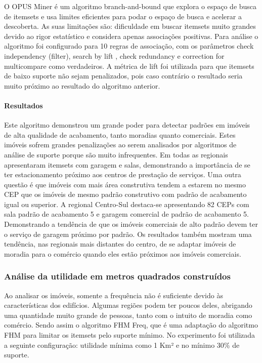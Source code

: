 \documentclass[12pt]{article}
\begin{document}
O OPUS Miner é um algoritmo branch-and-bound que explora o espaço de busca de itemsets e usa limites eficientes para podar o espaço de busca e acelerar a descoberta. As suas limitações são: dificuldade em buscar itemsets muito grandes devido ao rigor estatístico e considera apenas associações positivas. Para análise o algoritmo foi configurado para 10 regras de associação, com os parâmetros check independency (filter), search by lift \cite{wiki:lift}, check redundancy e correction for multicompare como verdadeiros. A métrica de lift foi utilizada para que itemsets de baixo suporte não sejam penalizados, pois caso contrário o resultado seria muito próximo ao resultado do algoritmo anterior.

\paragraph{Resultados}
Este algoritmo demonstrou um grande poder para detectar padrões em imóveis de alta qualidade de acabamento, tanto moradias quanto comerciais. Estes imóveis sofrem grandes penalizações ao serem analisados por algoritmos de análise de suporte porque são muito infrequentes. Em todas as regionais apresentaram itemsets com garagem e salas, demonstrando a importância de se ter estacionamento próximo aos centros de prestação de serviços. Uma outra questão é que imóveis com mais área construtiva tendem a estarem no mesmo CEP que os imóveis de mesmo padrão construtivo com padrão de acabamento igual ou superior. A regional Centro-Sul destaca-se apresentando 82 CEPs com sala padrão de acabamento 5 e garagem comercial de padrão de acabamento 5. Demonstrando a tendência de que os imóveis comerciais de alto padrão devem ter o serviço de garagem próximo por padrão. Os resultados também mostram uma tendência, nas regionais mais distantes do centro, de se adaptar imóveis de moradia para o comércio quando eles estão próximos aos imóveis comerciais.

\subsubsection{Análise da utilidade em metros quadrados construídos}
Ao analisar os imóveis, somente a frequência não é suficiente devido às características dos edifícios. Algumas regiões podem ter poucos deles, abrigando uma quantidade muito grande de pessoas, tanto com o intuito de moradia como comércio. Sendo assim o algoritmo FHM Freq, que é uma adaptação do algoritmo FHM \cite{fournier2014fhm} para limitar os itemsets pelo suporte mínimo. No experimento foi utilizada a seguinte configuração: utilidade mínima como 1 Km² e no mínimo 30\% de suporte.
\end{document}
